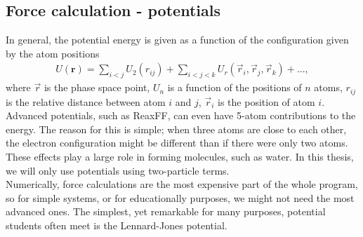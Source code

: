 \subsection{Force calculation - potentials}
In general, the potential energy is given as a function of the configuration given by the atom positions
\begin{align}
	U(\textbf{r}) = \sum_{i<j}U_2(r_{ij}) + \sum_{i<j<k} U_r(\vec r_i, \vec r_j, \vec r_k) + ...,
\end{align}
where $\vec r$ is the phase space point, $U_n$ is a function of the positions of $n$ atoms, $r_{ij}$ is the relative distance between atom $i$ and $j$, $\vec r_i$ is the position of atom $i$. Advanced potentials, such as ReaxFF, can even have 5-atom contributions to the energy\cite{van2001reaxff}. The reason for this is simple; when three atoms are close to each other, the electron configuration might be different than if there were only two atoms. These effects play a large role in forming molecules, such as water. In this thesis, we will only use potentials using two-particle terms.\\
Numerically, force calculations are the most expensive part of the whole program, so for simple systems, or for educationally purposes, we might not need the most advanced ones. The simplest, yet remarkable for many purposes, potential students often meet is the Lennard-Jones potential. 
